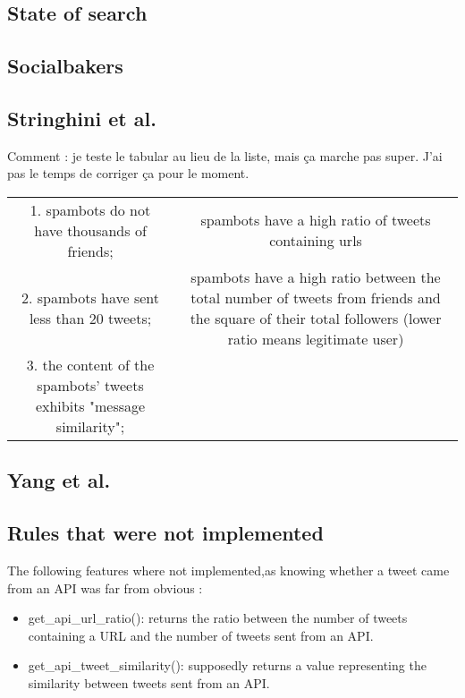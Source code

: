\documentclass[a4paper,11pt]{article}
\begin{document}
\subsection{State of search}


\subsection{Socialbakers}

\subsection{Stringhini et al.}

Comment : je teste le tabular au lieu de la liste, mais ça marche pas super. J'ai pas le temps de corriger ça pour le moment.\\

\begin{tabular}{cc}
\hline
1. spambots do not have thousands of friends; & spambots have a high ratio of tweets containing urls\\
2. spambots have sent less than 20 tweets; & spambots have a high ratio between the total number of tweets from friends and the square of their total followers (lower ratio means legitimate user)\\
3. the content of the spambots' tweets exhibits "message similarity"; & \\
\hline
\end{tabular}


\subsection{Yang et al.}

\subsection{Rules that were not implemented}
The following features where not implemented,as knowing whether a tweet came from an API was far from obvious : \\

\begin{itemize}
\item{get\_api\_url\_ratio(): returns the ratio between the number of tweets containing a URL and the number of tweets sent from an API.}
\item{get\_api\_tweet\_similarity(): supposedly returns a value representing the similarity between tweets sent from an API.}
\end{itemize} 
\end{document}
